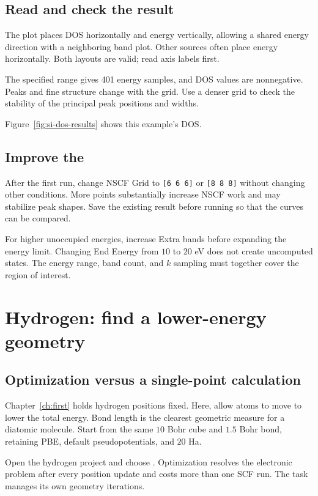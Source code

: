 \subsection{Read and check the result}

The plot places DOS horizontally and energy vertically, allowing a shared energy direction with a neighboring band plot. Other sources often place energy horizontally. Both layouts are valid; read axis labels first.

The specified range gives 401 energy samples, and DOS values are nonnegative. Peaks and fine structure change with the grid. Use a denser grid to check the stability of the principal peak positions and widths.

Figure~\ref{fig:si-dos-results} shows this example's DOS.

\subsection{Improve the }

After the first run, change NSCF Grid to \texttt{[6 6 6]} or \texttt{[8 8 8]} without changing other conditions. More points substantially increase NSCF work and may stabilize peak shapes. Save the existing result before running so that the curves can be compared.

For higher unoccupied energies, increase Extra bands before expanding the energy limit. Changing End Energy from $10$ to $20$ eV does not create uncomputed states. The energy range, band count, and $k$ sampling must together cover the region of interest.

\section{Hydrogen: find a lower-energy geometry}

\subsection{Optimization versus a single-point calculation}

Chapter~\ref{ch:first} holds hydrogen positions fixed. Here, allow atoms to move to lower the total energy. Bond length is the clearest geometric measure for a diatomic molecule. Start from the same $10$ Bohr cube and $1.5$ Bohr bond, retaining PBE, default pseudopotentials, and $20$ Ha.

Open the hydrogen project and choose . Optimization resolves the electronic problem after every position update and costs more than one SCF run. The task manages its own geometry iterations.

